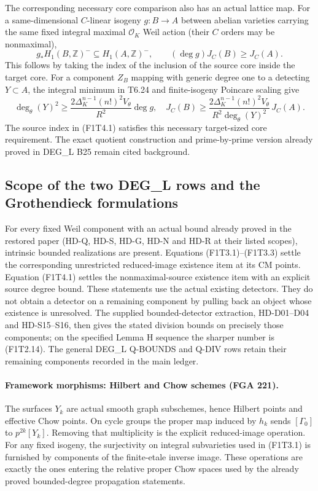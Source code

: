 The corresponding necessary core comparison also has an actual
lattice map. For a same-dimensional $C$-linear isogeny $g:B\to A$
between abelian varieties carrying the same fixed integral maximal
$\mathcal O_K$ Weil action (their $C$ orders may be nonmaximal),
\[
 g_*H_1(B,\mathbb Z)^-\subseteq H_1(A,\mathbb Z)^-,
 \qquad (\deg g)J_C(B)\ge J_C(A).                         \tag{F1T4.2}
\]
This follows by taking the index of the inclusion of the source
core inside the target core. For a component $Z_B$ mapping with
generic degree one to a detecting $Y\subset A$, the integral
minimum in T6.24 and finite-isogeny Poincare scaling give
\[
 \deg_\theta(Y)^2\ge
       \frac{2\Delta_K^{n-1}(n!)^2V_\theta}{R^2}\deg g,
 \quad
 J_C(B)\ge
       \frac{2\Delta_K^{n-1}(n!)^2V_\theta}
            {R^2\deg_\theta(Y)^2}\,J_C(A).                \tag{F1T4.3}
\]
The source index in (F1T4.1) satisfies this necessary target-sized
core requirement. The exact quotient construction and prime-by-prime
version already proved in DEG\_L B25 remain cited background.

\subsection{Scope of the two DEG\_L rows and the Grothendieck formulations}

For every fixed Weil component with an actual bound already proved
in the restored paper (HD-Q, HD-S, HD-G, HD-N and HD-R at their
listed scopes), intrinsic bounded realizations are present.
Equations (F1T3.1)--(F1T3.3) settle the corresponding unrestricted
reduced-image existence item at its CM points. Equation (F1T4.1)
settles the nonmaximal-source existence item with an explicit source
degree bound. These statements use the actual existing detectors.
They do not obtain a detector on a remaining component by pulling
back an object whose existence is unresolved.
The supplied bounded-detector extraction, HD-D01--D04 and
HD-S15--S16, then gives the stated division bounds on precisely
those components; on the specified Lemma H sequence the sharper
number is (F1T2.14). The general DEG\_L Q-BOUNDS and Q-DIV rows
retain their remaining components recorded in the main ledger.

\paragraph{Framework morphisms: Hilbert and Chow schemes (FGA 221).}
The surfaces $Y_k$ are actual smooth graph subschemes, hence
Hilbert points and effective Chow points. On cycle groups the
proper map induced by $h_k$ sends
$[\Gamma_0]$ to $p^{2k}[Y_k]$. Removing that multiplicity is the
explicit reduced-image operation. For any fixed isogeny, the
surjectivity on integral subvarieties used in (F1T3.1) is furnished
by components of the finite-etale inverse image. These operations
are exactly the ones entering the relative proper Chow spaces
used by the already proved bounded-degree propagation statements.

